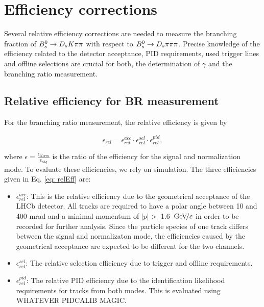\section{Efficiency corrections}

Several relative efficiency corrections are needed to measure the branching fraction of ${{B}^0_{s}}\rightarrow{\ensuremath{{D}_{s}}}{\ensuremath{K}}{\ensuremath{\pi}}{\ensuremath{\pi}}$ with respect to ${{B}^0_{s}}\rightarrow{\ensuremath{{D}_{s}}}{\ensuremath{\pi}}{\ensuremath{\pi}}{\ensuremath{\pi}}$. Precise knowledge of the efficiency related to the detector acceptance, PID requirements, used trigger lines and offline selections are crucial for both, the determination of $\gamma$ and the branching ratio measurement.

\subsection{Relative efficiency for BR measurement}
For the branching ratio measurement, the relative efficiency is given by

\begin{equation} 
\epsilon_{rel} = \epsilon^{acc}_{rel}\cdot\epsilon^{sel}_{rel}\cdot\epsilon^{pid}_{rel},
\label{eq: relEff}
\end{equation}

where $\epsilon = \frac{\epsilon_{Norm}}{\epsilon_{Sig}}$ is the ratio of the efficiency for the signal and normalization mode. To evaluate these efficiencies, we rely on simulation. The three efficiencies given in Eq. \ref{eq: relEff} are:

\begin{itemize}

\item $\epsilon^{acc}_{rel}$: This is the relative efficiency due to the geometrical acceptance of the LHCb detector. All tracks are required to have a polar angle between 10 and 400 mrad and a minimal momentum of $|p| >$ 1.6 ${\mathrm{\,Ge\kern -0.1em V\!/}c}$ in order to be recorded for further analysis. Since the particle species of one track differs between the signal and normalizaton mode, the efficiencies caused by the geometrical acceptance are expected to be different for the two channels.

\item $\epsilon^{sel}_{rel}$: The relative selection efficiency due to trigger and offline requirements. 

\item $\epsilon^{pid}_{rel}$: The relative PID efficiency due to the identification likelihood requirements for tracks from both modes. This is evaluated using WHATEVER PIDCALIB MAGIC.

\end{itemize}

